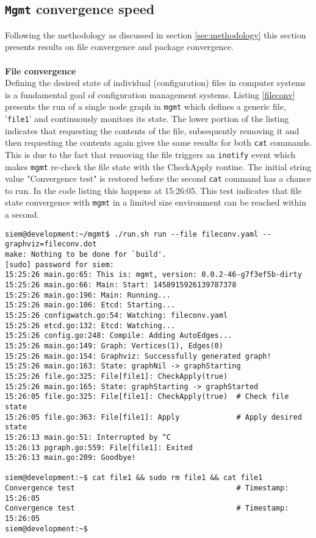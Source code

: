 \subsection{\texttt{Mgmt} convergence speed}
Following the methodology as discussed in section \ref{sec:methodology} this section presents results on file convergence and package convergence. 
\\\\
\noindent
\textbf{File convergence}\\
Defining the desired state of individual (configuration) files in computer systems is a fundamental goal of configuration management systems. Listing \ref{fileconv} presents the run of a single node graph in \texttt{mgmt} which defines a generic file, '\texttt{file1}' and continuously monitors its state. The lower portion of the listing indicates that requesting the contents of the file, subsequently removing it and then requesting the contents again gives the same results for both \texttt{cat} commands. This is due to the fact that removing the file triggers an \texttt{inotify} event which makes \texttt{mgmt} re-check the file state with the CheckApply routine. The initial string value "Convergence test" is restored before the second \texttt{cat} command has a chance to run. In the code listing this happens at 15:26:05. This test indicates that file state convergence with \texttt{mgmt} in a limited size environment can be reached within a second.
\\
\begin{lstlisting}[caption={Rapid file convergence in \texttt{mgmt}},label=fileconv]
siem@development:~/mgmt$ ./run.sh run --file fileconv.yaml --graphviz=fileconv.dot
make: Nothing to be done for `build'.
[sudo] password for siem: 
15:25:26 main.go:65: This is: mgmt, version: 0.0.2-46-g7f3ef5b-dirty
15:25:26 main.go:66: Main: Start: 1458915926139787378
15:25:26 main.go:196: Main: Running...
15:25:26 main.go:106: Etcd: Starting...
15:25:26 configwatch.go:54: Watching: fileconv.yaml
15:25:26 etcd.go:132: Etcd: Watching...
15:25:26 config.go:248: Compile: Adding AutoEdges...
15:25:26 main.go:149: Graph: Vertices(1), Edges(0)
15:25:26 main.go:154: Graphviz: Successfully generated graph!
15:25:26 main.go:163: State: graphNil -> graphStarting
15:25:26 file.go:325: File[file1]: CheckApply(true)
15:25:26 main.go:165: State: graphStarting -> graphStarted
15:26:05 file.go:325: File[file1]: CheckApply(true)  # Check file state
15:26:05 file.go:363: File[file1]: Apply             # Apply desired state 
15:26:13 main.go:51: Interrupted by ^C
15:26:13 pgraph.go:559: File[file1]: Exited
15:26:13 main.go:209: Goodbye!

siem@development:~$ cat file1 && sudo rm file1 && cat file1 
Convergence test                                     # Timestamp: 15:26:05
Convergence test                                     # Timestamp: 15:26:05
siem@development:~$ 
\end{lstlisting}
